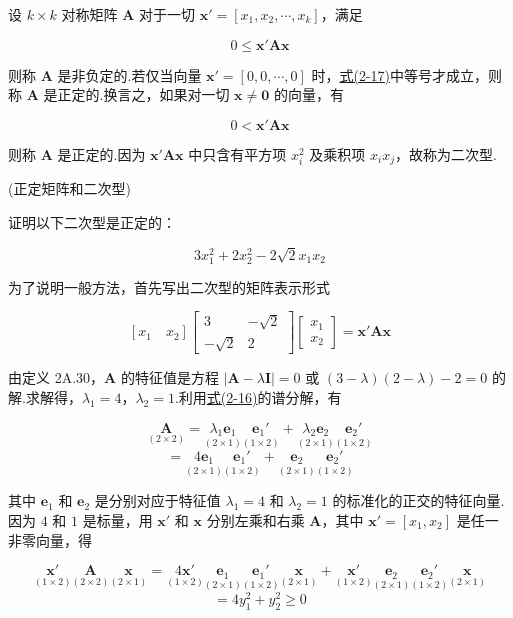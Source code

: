 
设 $k\times k$ 对称矩阵 $\bm{A}$ 对于一切 $\bm{x}'=[x_1,x_2,\cdots,x_k]$，满足

\label{eq:2-17}
\begin{equation}
0\leqslant \bm{x}'\bm{A}\bm{x} \tag{2-17}
\end{equation}

则称 $\bm{A}$ 是非负定的.若仅当向量 $\bm{x}'=[0,0,\cdots,0]$ 时，\hyperref[eq:2-17]{式(2-17)}中等号才成立，则称 $\bm{A}$ 是正定的.换言之，如果对一切 $\bm{x}\neq \bm{0}$ 的向量，有

\label{eq:2-18}
\begin{equation}
0<\bm{x}'\bm{A}\bm{x} \tag{2-18}
\end{equation}

则称 $\bm{A}$ 是正定的.因为 $\bm{x}'\bm{A}\bm{x}$ 中只含有平方项 $x_i^2$ 及乘积项 $x_ix_j$，故称为二次型.

 \quad (正定矩阵和二次型)

证明以下二次型是正定的：

\[
3x_1^2+2x_2^2-2\sqrt{2}x_1x_2
\]

为了说明一般方法，首先写出二次型的矩阵表示形式

\[
[x_1 \quad x_2]
\begin{bmatrix}
3 & -\sqrt{2}\\
-\sqrt{2} & 2
\end{bmatrix}
\begin{bmatrix}
x_1\\
x_2
\end{bmatrix}
=\bm{x}'\bm{A}\bm{x}
\]

由定义 2A.30，$\bm{A}$ 的特征值是方程 $|\bm{A}-\lambda \bm{I}|=0$ 或 $(3-\lambda)(2-\lambda)-2=0$ 的解.求解得，$\lambda_1=4$，$\lambda_2=1$.利用\hyperref[eq:2-16]{式(2-16)}的谱分解，有

\[
\underset{(2\times2)}{\bm{A}}=\underset{(2\times1)}{\lambda_1\bm{e}_1}\underset{(1\times2)}{\bm{e}_1'}+\underset{(2\times1)}{\lambda_2\bm{e}_2}\underset{(1\times2)}{\bm{e}_2'}
\]
\[
=\underset{(2\times1)}{4\bm{e}_1}\underset{(1\times2)}{\bm{e}_1'}+\underset{(2\times1)}{\bm{e}_2}\underset{(1\times2)}{\bm{e}_2'}
\]

其中 $\bm{e}_1$ 和 $\bm{e}_2$ 是分别对应于特征值 $\lambda_1=4$ 和 $\lambda_2=1$ 的标准化的正交的特征向量.因为 $4$ 和 $1$ 是标量，用 $\bm{x}'$ 和 $\bm{x}$ 分别左乘和右乘 $\bm{A}$，其中 $\bm{x}'=[x_1,x_2]$ 是任一非零向量，得

\[
\underset{(1\times2)}{\bm{x}'}\underset{(2\times2)}{\bm{A}}\underset{(2\times1)}{\bm{x}}=\underset{(1\times2)}{4\bm{x}'}\underset{(2\times1)}{\bm{e}_1}\underset{(1\times2)}{\bm{e}_1'}\underset{(2\times1)}{\bm{x}}+\underset{(1\times2)}{\bm{x}'}\underset{(2\times1)}{\bm{e}_2}\underset{(1\times2)}{\bm{e}_2'}\underset{(2\times1)}{\bm{x}}
\]
\[
=4y_1^2+y_2^2\geqslant 0
\]


